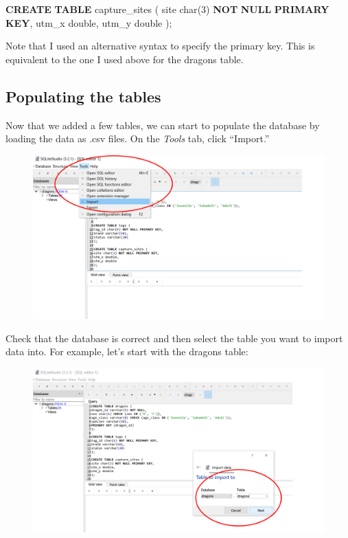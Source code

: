 \documentclass[
]{book}
\newenvironment{Shaded}{\begin{snugshade}}{\end{snugshade}}
\newcommand{\DataTypeTok}[1]{\textcolor[rgb]{0.13,0.29,0.53}{#1}}
\newcommand{\DecValTok}[1]{\textcolor[rgb]{0.00,0.00,0.81}{#1}}
\newcommand{\KeywordTok}[1]{\textcolor[rgb]{0.13,0.29,0.53}{\textbf{#1}}}
\newcommand{\NormalTok}[1]{#1}
\begin{document}
\begin{Shaded}
\begin{Highlighting}[]
\KeywordTok{CREATE} \KeywordTok{TABLE}\NormalTok{ capture\_sites (}
\NormalTok{site }\DataTypeTok{char}\NormalTok{(}\DecValTok{3}\NormalTok{) }\KeywordTok{NOT} \KeywordTok{NULL} \KeywordTok{PRIMARY} \KeywordTok{KEY}\NormalTok{,}
\NormalTok{utm\_x }\DataTypeTok{double}\NormalTok{,}
\NormalTok{utm\_y }\DataTypeTok{double}
\NormalTok{);}
\end{Highlighting}
\end{Shaded}

Note that I used an alternative syntax to specify the primary key.
This is equivalent to the one I used above for the dragons table.

\hypertarget{populating-the-tables}{%
\subsection{Populating the tables}\label{populating-the-tables}}

Now that we added a few tables, we can start to populate the database by loading
the data as .csv files. On the \emph{Tools} tab, click ``Import.''

\begin{figure}

{\centering \includegraphics[width=0.8\linewidth]{img/sqlite_import1} 

}

\caption{ }\label{fig:db-import1}
\end{figure}

Check that the database is correct and then select the table you want to import
data into. For example, let's start with the dragons table:

\begin{figure}

{\centering \includegraphics[width=0.8\linewidth]{img/sqlite_import2} 

}

\caption{ }\label{fig:db-import2}
\end{figure}
\end{document}
